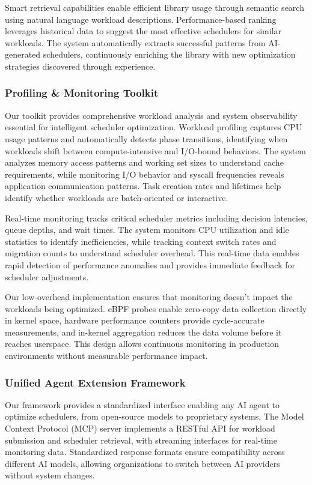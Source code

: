 Smart retrieval capabilities enable efficient library usage through semantic search using natural language workload descriptions. Performance-based ranking leverages historical data to suggest the most effective schedulers for similar workloads. The system automatically extracts successful patterns from AI-generated schedulers, continuously enriching the library with new optimization strategies discovered through experience.

\subsubsection{Profiling \& Monitoring Toolkit}
Our toolkit provides comprehensive workload analysis and system observability essential for intelligent scheduler optimization. Workload profiling captures CPU usage patterns and automatically detects phase transitions, identifying when workloads shift between compute-intensive and I/O-bound behaviors. The system analyzes memory access patterns and working set sizes to understand cache requirements, while monitoring I/O behavior and syscall frequencies reveals application communication patterns. Task creation rates and lifetimes help identify whether workloads are batch-oriented or interactive.

Real-time monitoring tracks critical scheduler metrics including decision latencies, queue depths, and wait times. The system monitors CPU utilization and idle statistics to identify inefficiencies, while tracking context switch rates and migration counts to understand scheduler overhead. This real-time data enables rapid detection of performance anomalies and provides immediate feedback for scheduler adjustments.

Our low-overhead implementation ensures that monitoring doesn't impact the workloads being optimized. eBPF probes enable zero-copy data collection directly in kernel space, hardware performance counters provide cycle-accurate measurements, and in-kernel aggregation reduces the data volume before it reaches userspace. This design allows continuous monitoring in production environments without measurable performance impact.

\subsubsection{Unified Agent Extension Framework}
Our framework provides a standardized interface enabling any AI agent to optimize schedulers, from open-source models to proprietary systems. The Model Context Protocol (MCP) server implements a RESTful API for workload submission and scheduler retrieval, with streaming interfaces for real-time monitoring data. Standardized response formats ensure compatibility across different AI models, allowing organizations to switch between AI providers without system changes.

